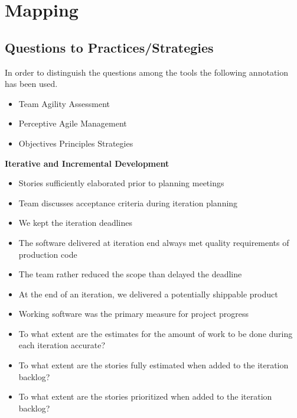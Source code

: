 \chapter{Mapping}
\label{ch:mapping}


\section{Questions to Practices/Strategies}

\newcommand*\taa{\item[\FiveStar]}
\newcommand*\taar{\item[\FiveStarShadow]}
\newcommand*\taanr{\item[\SnowflakeChevron]}
\newcommand*\pam{\item[\AsteriskBold]}
\newcommand*\pamr{\item[\AsteriskThinCenterOpen]}
\newcommand*\ops{\item[\FiveStarOutlineHeavy]}

In order to distinguish the questions among the tools the following annotation has been used. 
\begin{itemize}
  \taa Team Agility Assessment%
  \pam Perceptive Agile Management%
  \ops Objectives Principles Strategies
\end{itemize}

\vspace{0.5cm}

\textbf{Iterative and Incremental Development}
\begin{itemize}
	\taa Stories sufficiently elaborated prior to planning meetings
	\taa Team discusses acceptance criteria during iteration planning %
	\pam We kept the iteration deadlines %
	\pam The software delivered at iteration end always met quality requirements of production code %
	\pam The team rather reduced the scope than delayed the deadline %
	\pam At the end of an iteration, we delivered a potentially shippable product %
	\pam Working software was the primary measure for project progress %
	\ops To what extent are the estimates for the amount of work to be done during each iteration accurate?
	\ops To what extent are the stories fully estimated when added to the iteration backlog?
	\ops To what extent are the stories prioritized when added to the iteration backlog?	
\end{itemize}


